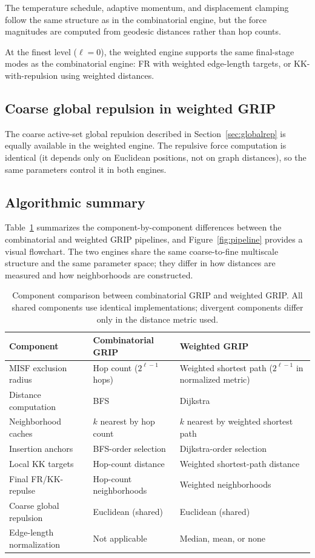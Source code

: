 \documentclass[11pt,twocolumn]{article}
\begin{document}
The temperature schedule, adaptive momentum, and displacement clamping
follow the same structure as in the combinatorial engine, but the force
magnitudes are computed from geodesic distances rather than hop counts.

At the finest level ($\ell = 0$), the weighted engine supports the same
final-stage modes as the combinatorial engine: FR with weighted
edge-length targets, or KK-with-repulsion using weighted distances.

\subsection{Coarse global repulsion in weighted GRIP}

The coarse active-set global repulsion described in
Section~\ref{sec:globalrep} is equally available in the weighted engine.
The repulsive force computation is identical (it depends only on
Euclidean positions, not on graph distances), so the same parameters
control it in both engines.

\subsection{Algorithmic summary}

Table~\ref{tab:pipeline} summarizes the component-by-component
differences between the combinatorial and weighted GRIP pipelines, and
Figure~\ref{fig:pipeline} provides a visual flowchart.  The
two engines share the same coarse-to-fine multiscale structure and the
same parameter space; they differ in how distances are measured and how
neighborhoods are constructed.

\begin{table}[!htb]
\centering
\caption{Component comparison between combinatorial GRIP and weighted
  GRIP.  All shared components use identical implementations; divergent
  components differ only in the distance metric used.}
\label{tab:pipeline}
\small
\begin{tabular}{lll}
\toprule
Component & Combinatorial GRIP & Weighted GRIP \\
\midrule
MISF exclusion radius & Hop count ($2^{\ell-1}$ hops) & Weighted shortest path ($2^{\ell-1}$ in normalized metric) \\
Distance computation & BFS & Dijkstra \\
Neighborhood caches & $k$ nearest by hop count & $k$ nearest by weighted shortest path \\
Insertion anchors & BFS-order selection & Dijkstra-order selection \\
Local KK targets & Hop-count distance & Weighted shortest-path distance \\
Final FR/KK-repulse & Hop-count neighborhoods & Weighted neighborhoods \\
Coarse global repulsion & Euclidean (shared) & Euclidean (shared) \\
Edge-length normalization & Not applicable & Median, mean, or none \\
\bottomrule
\end{tabular}
\end{table}
\end{document}
